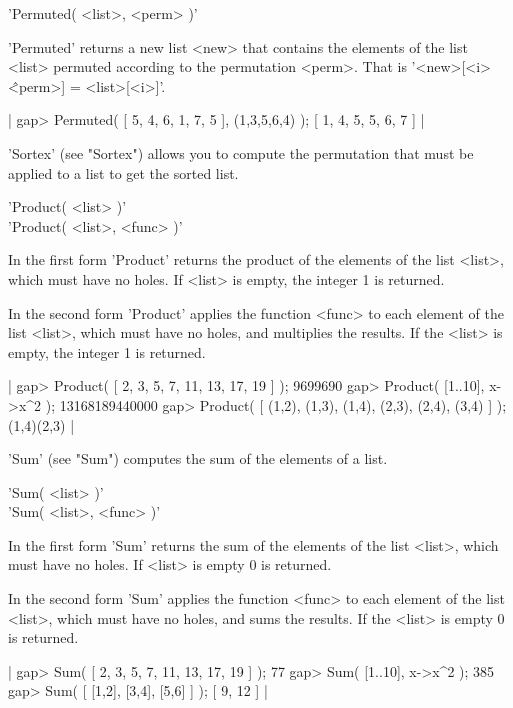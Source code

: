 
'Permuted( <list>, <perm> )'

'Permuted' returns  a new  list <new> that contains  the elements  of the
list  <list>  permuted according  to  the  permutation  <perm>.   That is
'<new>[<i>\^<perm>] = <list>[<i>]'.

|    gap> Permuted( [ 5, 4, 6, 1, 7, 5 ], (1,3,5,6,4) );
    [ 1, 4, 5, 5, 6, 7 ] |

'Sortex' (see "Sortex") allows you to compute the permutation that must
be applied to a list to get the sorted list.

%

'Product( <list> )' \\
'Product( <list>, <func> )'

In the first form 'Product' returns  the product  of  the elements of the
list <list>, which must have no holes.  If <list> is empty, the integer 1
is returned.

In the second form 'Product' applies the function <func> to  each element
of the list <list>, which must have no holes, and multiplies the results.
If the <list> is empty, the integer 1 is returned.

|    gap> Product( [ 2, 3, 5, 7, 11, 13, 17, 19 ] );
    9699690
    gap> Product( [1..10], x->x^2 );
    13168189440000
    gap> Product( [ (1,2), (1,3), (1,4), (2,3), (2,4), (3,4) ] );
    (1,4)(2,3) |

'Sum' (see "Sum") computes the sum of the elements of a list.

%

'Sum( <list> )' \\
'Sum( <list>, <func> )'

In the first form 'Sum'   returns the sum  of the  elements of the   list
<list>, which must have no holes.  If <list> is empty 0 is returned.

In the second form 'Sum'  applies the function <func>  to each element of
the list <list>, which must have no holes, and  sums the results.  If the
<list> is empty 0 is returned.

|    gap> Sum( [ 2, 3, 5, 7, 11, 13, 17, 19 ] );
    77
    gap> Sum( [1..10], x->x^2 );
    385
    gap> Sum( [ [1,2], [3,4], [5,6] ] );
    [ 9, 12 ] |

